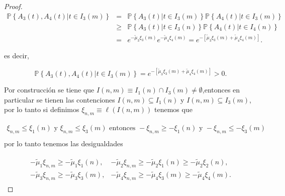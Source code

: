 \documentclass{article}
\newcommand{\prob}{\mathbb{P}}
\numberwithin{equation}{section}
\begin{document}
\begin{proof}
\begin{eqnarray*}
\prob\left\{A_{3}\left(t\right),A_{4}\left(t\right)|t\in I_{3}\left(m\right)\right\}&=&
\prob\left\{A_{3}\left(t\right)|t\in I_{3}\left(m\right)\right\}
\prob\left\{A_{4}\left(t\right)|t\in I_{3}\left(m\right)\right\}\\
&\geq&
\prob\left\{A_{3}\left(t\right)|t\in I_{3}\left(n\right)\right\}
\prob\left\{A_{4}\left(t\right)|t\in I_{4}\left(n\right)\right\}\\
&=&e^{-\tilde{\mu}_{3}\xi_{3}\left(m\right)}e^{-\tilde{\mu}_{4}\xi_{4}
\left(m\right)}
=e^{-\left[\tilde{\mu}_{3}\xi_{3}\left(m\right)+\tilde{\mu}_{4}\xi_{4}
\left(m\right)\right]}.
\end{eqnarray*}


es decir, 

\begin{equation}
\prob\left\{A_{3}\left(t\right),A_{4}\left(t\right)|t\in I_{3}\left(m\right)\right\}
=e^{-\left[\tilde{\mu}_{3}\xi_{3}\left(m\right)+\tilde{\mu}_{4}\xi_{4}
\left(m\right)\right]}>0.
\end{equation}

Por construcci\'on se tiene que $I\left(n,m\right)\equiv I_{1}\left(n\right)\cap I_{3}\left(m\right)\neq\emptyset$,entonces en particular se tienen las contenciones $I\left(n,m\right)\subseteq I_{1}\left(n\right)$ y $I\left(n,m\right)\subseteq I_{3}\left(m\right)$, por lo tanto si definimos $\xi_{n,m}\equiv\ell\left(I\left(n,m\right)\right)$ tenemos que

\begin{eqnarray*}
\xi_{n,m}\leq\xi_{1}\left(n\right)\textrm{ y }\xi_{n,m}\leq\xi_{3}\left(m\right)\textrm{ entonces }
-\xi_{n,m}\geq-\xi_{1}\left(n\right)\textrm{ y }-\xi_{n,m}\leq-\xi_{3}\left(m\right)\\
\end{eqnarray*}
por lo tanto tenemos las desigualdades 



\begin{eqnarray*}
\begin{array}{ll}
-\tilde{\mu}_{1}\xi_{n,m}\geq-\tilde{\mu}_{1}\xi_{1}\left(n\right),&
-\tilde{\mu}_{2}\xi_{n,m}\geq-\tilde{\mu}_{2}\xi_{1}\left(n\right)
\geq-\tilde{\mu}_{2}\xi_{2}\left(n\right),\\
-\tilde{\mu}_{3}\xi_{n,m}\geq-\tilde{\mu}_{3}\xi_{3}\left(m\right),&
-\tilde{\mu}_{4}\xi_{n,m}\geq-\tilde{\mu}_{4}\xi_{3}\left(m\right)
\geq-\tilde{\mu}_{4}\xi_{4}\left(m\right).
\end{array}
\end{eqnarray*}


\end{proof}
\end{document}
